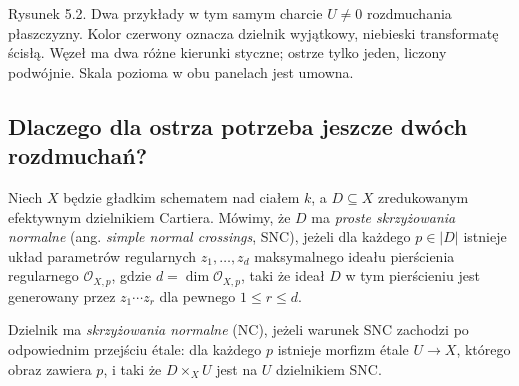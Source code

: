 \begin{center}

{\small Rysunek 5.2. Dwa przykłady w tym samym charcie $U\ne0$ rozdmuchania płaszczyzny. Kolor czerwony oznacza dzielnik wyjątkowy, niebieski transformatę ścisłą. Węzeł ma dwa różne kierunki styczne; ostrze tylko jeden, liczony podwójnie. Skala pozioma w obu panelach jest umowna.}\par
\end{center}

\subsection{Dlaczego dla ostrza potrzeba jeszcze dwóch rozdmuchań?}

\begin{definicja}
\label{def:ga5-snc}
Niech $X$ będzie gładkim schematem nad ciałem $k$, a
$D\subseteq X$ zredukowanym efektywnym dzielnikiem Cartiera.
Mówimy, że $D$ ma \emph{proste skrzyżowania normalne}
(ang. \emph{simple normal crossings}, SNC), jeżeli dla każdego
$p\in |D|$ istnieje układ parametrów regularnych
$z_1,\ldots,z_d$ maksymalnego ideału pierścienia
regularnego $\mathcal O_{X,p}$, gdzie
$d=\dim\mathcal O_{X,p}$, taki że ideał $D$ w tym
pierścieniu jest generowany przez $z_1\cdots z_r$
dla pewnego $1\le r\le d$.

Dzielnik ma \emph{skrzyżowania normalne} (NC), jeżeli
warunek SNC zachodzi po odpowiednim przejściu étale:
dla każdego $p$ istnieje morfizm étale $U\to X$,
którego obraz zawiera $p$, i taki że $D\times_XU$ jest
na $U$ dzielnikiem SNC.
\end{definicja}

